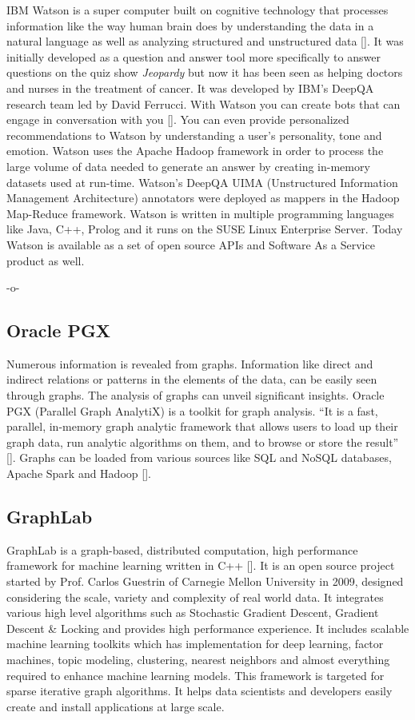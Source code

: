 IBM Watson is a super computer built on cognitive technology that
processes information like the way human brain does by understanding
the data in a natural language as well as analyzing structured and
unstructured data [\cite{www-ibmwatson-wiki}].  It was initially
developed as a question and answer tool more specifically to answer
questions on the quiz show \textit{Jeopardy} but now it has been seen as
helping doctors and nurses in the treatment of cancer. It was
developed by IBM's DeepQA research team led by David Ferrucci. With
Watson you can create bots that can engage in conversation with
you [\cite{www-ibmwatson}]. You can even provide personalized
recommendations to Watson by understanding a user's personality, tone
and emotion. Watson uses the Apache Hadoop framework in order to
process the large volume of data needed to generate an answer by
creating in-memory datasets used at run-time. Watson's DeepQA UIMA
(Unstructured Information Management Architecture) annotators were
deployed as mappers in the Hadoop Map-Reduce framework. Watson is
written in multiple programming languages like Java, C++, Prolog and
it runs on the SUSE Linux Enterprise Server. Today Watson is available
as a set of open source APIs and Software As a Service product as
well\cite{www-ibmwatson}.

    -o-
    
\subsection{Oracle PGX}

Numerous information is revealed from graphs. Information like direct
and indirect relations or patterns in the elements of the data, can be
easily seen through graphs. The analysis of graphs can unveil
significant insights. Oracle PGX (Parallel Graph AnalytiX) is a
toolkit for graph analysis.  ``It is a fast, parallel, in-memory graph
analytic framework that allows users to load up their graph data, run
analytic algorithms on them, and to browse or store the
result'' [\cite{www-pgx}]. Graphs can be loaded from various sources
like SQL and NoSQL databases, Apache Spark and Hadoop [\cite{www-ora}].
    
\subsection{GraphLab}

GraphLab is a graph-based, distributed computation, high performance
framework for machine learning written in C++ [\cite{www-graphlab}]. It
is an open source project started by Prof. Carlos Guestrin of Carnegie
Mellon University in 2009, designed considering the scale, variety and
complexity of real world data. It integrates various high level
algorithms such as Stochastic Gradient Descent, Gradient Descent \&
Locking and provides high performance experience. It includes scalable
machine learning toolkits which has implementation for deep learning,
factor machines, topic modeling, clustering, nearest neighbors and
almost everything required to enhance machine learning models. This
framework is targeted for sparse iterative graph algorithms. It helps
data scientists and developers easily create and install applications
at large scale.

